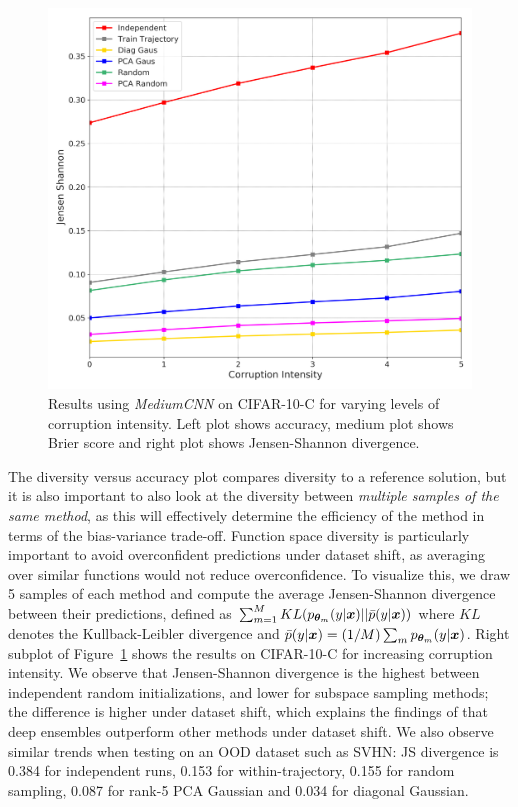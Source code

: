 \documentclass{article}
\newlength{\sfigwidth}
\newlength{\sfigwidththree}
\newlength{\sfigwidththreesubfigure}
\newcommand{\reducespaceafterfigure}{\vspace{-1em}} %
\begin{document}
\begin{figure}[th]
       \includegraphics[width=\sfigwidththreesubfigure]{figures/med_cnn_cifar_c_js.png}
   \reducespaceafterfigure %
    \reducespaceafterfigure
    \caption{
   Results using \emph{MediumCNN} on CIFAR-10-C for varying levels of corruption intensity. Left plot shows accuracy, medium plot shows Brier score and right plot shows Jensen-Shannon divergence. %
    }
      \label{fig:cifar10:acc-brier:clean-corruptions}%
\end{figure}%

The diversity versus accuracy plot compares diversity to a reference solution, but it is also important to also look at the diversity between \emph{multiple samples of the same method}, as this will effectively determine the efficiency of the method in terms of the bias-variance trade-off. Function space diversity is particularly important  to avoid overconfident predictions under dataset shift, as averaging over similar functions would not reduce overconfidence. To visualize this, we draw 5 samples of each method and compute the average Jensen-Shannon divergence between their predictions, defined as 
$\sum_{m=1}^M KL(p_{{\bm{\theta}}_m}(y|{\bm{x}})||\bar{p}(y|{\bm{x}}))$ where $KL$ denotes the Kullback-Leibler divergence and $\bar{p}(y|{\bm{x}})=(1/M) \sum_{m} p_{{\bm{\theta}}_m}(y|{\bm{x}})$.
Right subplot of Figure~\ref{fig:cifar10:acc-brier:clean-corruptions}
%
shows the results on CIFAR-10-C for increasing corruption intensity. We observe that Jensen-Shannon divergence is the highest between independent random initializations, and lower for subspace sampling methods; the difference is higher under dataset shift, which explains the findings of \citet{ovadia2019can} that deep ensembles outperform other methods under dataset shift. %
{We also observe similar trends when testing on an OOD dataset such as SVHN: JS divergence is 0.384 for independent runs, 0.153 for within-trajectory, 0.155 for random sampling, 
0.087 for rank-5 PCA Gaussian and 0.034  for diagonal Gaussian.
%
 } 
 
\end{document}
